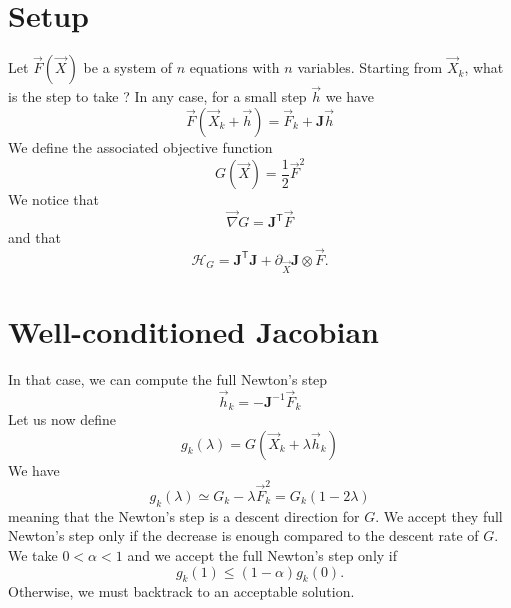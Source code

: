 \documentclass[aps,twocolumn]{revtex4}
\newcommand{\mymat}[1]{\boldsymbol{#1}}
\newcommand{\mytrn}[1]{{#1}^{\mathsf{T}}}
\newcommand{\mygrad}{\vec{\nabla}}
\newcommand{\myhess}{\mathcal{H}}
\begin{document}
\section{Setup}
Let $\vec{F}\left(\vec{X}\right)$ be a system of $n$ equations with $n$ variables.
Starting from $\vec{X}_k$, what is the step to take ?
In any case, for a small step $\vec{h}$ we have
\begin{equation}
	\vec{F}\left(\vec{X}_k+\vec{h}\right) = \vec{F}_k + \mymat{J} \vec{h}
\end{equation}
We define the associated objective function
\begin{equation}
	G\left(\vec{X}\right) = \frac{1}{2} \vec{F}^2
\end{equation}
We notice that
\begin{equation}
	\mygrad G = \mytrn{\mymat{J}}\vec{F}
\end{equation}
and that
\begin{equation}
	\myhess_G = \mytrn{\mymat{J}}\mymat{J} + \partial_{\vec{X}}\mymat{J} \otimes \vec{F}.
\end{equation}


\section{Well-conditioned Jacobian}
In that case, we can compute the full Newton's step
\begin{equation}
	\vec{h}_k = - \mymat{J}^{-1} \vec{F}_k
\end{equation}
Let us now define
\begin{equation}
	g_k(\lambda) =  G \left(\vec{X}_k + \lambda \vec{h}_k\right)
\end{equation}
We have
\begin{equation}
	g_k(\lambda) \simeq G_k - \lambda \vec{F}_k^2 = G_k(1 - 2\lambda)
\end{equation}
meaning that the Newton's step is a descent direction for $G$.
We accept they full Newton's step only if the decrease is enough compared to
the descent rate of $G$.
We take $0<\alpha<{1}$ and we accept the full Newton's step only if
$$
	g_k(1) \leq (1-\alpha) g_k(0).
$$
Otherwise, we must backtrack to an acceptable solution.
\end{document}
